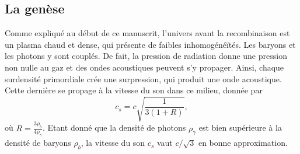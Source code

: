 \documentclass[11pt, twoside, a4paper, openright]{report}
\begin{document}
\subsection{La genèse}
Comme expliqué au début de ce manuscrit, l'univers avant la recombinaison est un plasma chaud et dense, qui présente de faibles inhomogénéïtés.
Les baryons et les photons y sont couplés. De fait, la pression de radiation donne une pression non nulle au gaz et des ondes acoustiques peuvent s'y propager. Ainsi, chaque surdensité primordiale crée une surpression, qui produit une onde acoustique. Cette dernière se propage à la vitesse du son dans ce milieu, donnée par
\begin{equation}
  \label{eq:sound_speed}
  c_{s} = c \sqrt{\frac{1}{3(1 + R)}},
\end{equation}
où $R = \frac{3\rho_b}{4\rho_{\gamma}}$. Etant donné que la densité de photons $\rho_{\gamma}$ est bien supérieure à la densité de baryons $\rho_{b}$, la vitesse du son $c_s$ vaut $c/\sqrt{3}$ en bonne approximation.
\end{document}
